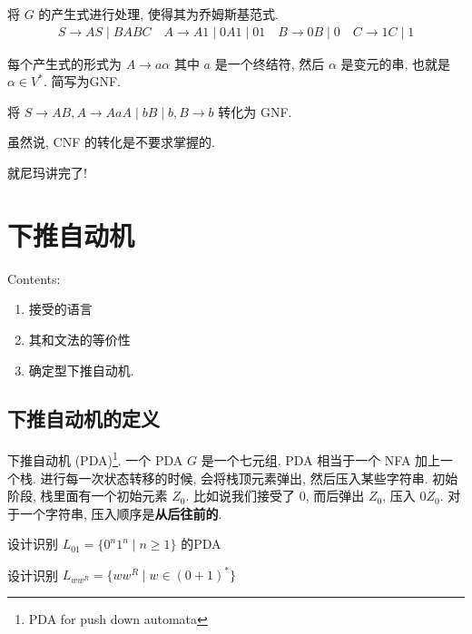 \documentclass[../main_part1.tex]{subfiles}
\begin{document}
\begin{exam}
	将 \(G\) 的产生式进行处理, 使得其为乔姆斯基范式. 
	\[
	\begin{aligned}
	S \to A S \mid B A B C \quad A \to A 1 \mid 0 A 1 \mid 01 \quad B \to 0 B \mid 0 \quad C \to 1 C \mid 1
	\end{aligned}
	\]
\end{exam}


\begin{definition}[格雷巴赫范式]\label{def:格雷巴赫范式}
	每个产生式的形式为 \(A \to a\alpha\) 其中 \(a\) 是一个终结符, 然后 \(\alpha\) 是变元的串, 也就是 \(\alpha \in  V ^{*}\). 简写为GNF. 
\end{definition}
\begin{exam}
将 \(S \to A B  , A \to Aa A \mid bB \mid b , B \to b\) 转化为 GNF.

虽然说, CNF 的转化是不要求掌握的. 
\end{exam}
就尼玛讲完了! 

\section{下推自动机}
\label{sec:下推自动机}

\noindent Contents:
\begin{enumerate}
	\item 接受的语言
	\item 其和文法的等价性
	\item 确定型下推自动机. 
\end{enumerate}

\subsection{下推自动机的定义}
\begin{definition}[下推自动机]\label{def:下推自动机}
	下推自动机 (PDA)\footnote{PDA for push down automata}. 一个 PDA \(G\) 是一个七元组. 
	PDA 相当于一个 NFA 加上一个栈. 进行每一次状态转移的时候, 会将栈顶元素弹出, 然后压入某些字符串. 
	初始阶段, 栈里面有一个初始元素 \(Z_{0}\). 比如说我们接受了 \(0\), 而后弹出 \(Z_{0}\), 压入 \(0Z_{0}\). 对于一个字符串, 压入顺序是\textbf{从后往前的}. 
\end{definition}

\begin{exam}
	设计识别 \(L _{01} = \{ 0 ^{n} 1 ^{n} \mid n \ge 1 \} \) 的PDA
\end{exam}

\begin{exam}
	设计识别 \(L _{w w ^{R}}= \{ w w ^{R} \mid w \in ( 0 + 1) ^{*} \}\)
\end{exam}

\end{document}
